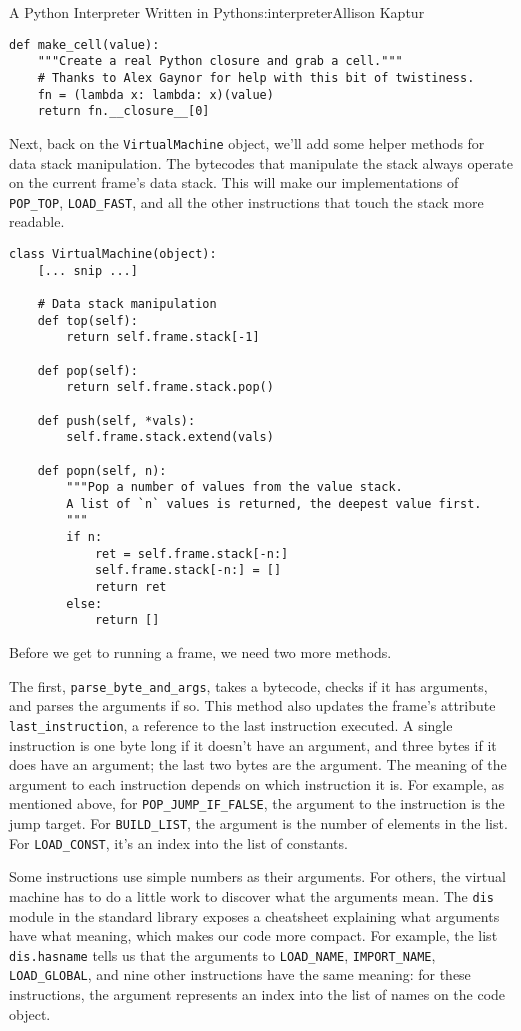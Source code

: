 \begin{aosachapter}{A Python Interpreter Written in Python}{s:interpreter}{Allison Kaptur}
\begin{verbatim}
def make_cell(value):
    """Create a real Python closure and grab a cell."""
    # Thanks to Alex Gaynor for help with this bit of twistiness.
    fn = (lambda x: lambda: x)(value)
    return fn.__closure__[0]
\end{verbatim}

Next, back on the \texttt{VirtualMachine} object, we'll add some helper
methods for data stack manipulation. The bytecodes that manipulate the
stack always operate on the current frame's data stack. This will make
our implementations of \texttt{POP\_TOP}, \texttt{LOAD\_FAST}, and all
the other instructions that touch the stack more readable.

\begin{verbatim}
class VirtualMachine(object):
    [... snip ...]

    # Data stack manipulation
    def top(self):
        return self.frame.stack[-1]

    def pop(self):
        return self.frame.stack.pop()

    def push(self, *vals):
        self.frame.stack.extend(vals)

    def popn(self, n):
        """Pop a number of values from the value stack.
        A list of `n` values is returned, the deepest value first.
        """
        if n:
            ret = self.frame.stack[-n:]
            self.frame.stack[-n:] = []
            return ret
        else:
            return []
\end{verbatim}

Before we get to running a frame, we need two more methods.

The first, \texttt{parse\_byte\_and\_args}, takes a bytecode, checks if
it has arguments, and parses the arguments if so. This method also
updates the frame's attribute \texttt{last\_instruction}, a reference to
the last instruction executed. A single instruction is one byte long if
it doesn't have an argument, and three bytes if it does have an
argument; the last two bytes are the argument. The meaning of the
argument to each instruction depends on which instruction it is. For
example, as mentioned above, for \texttt{POP\_JUMP\_IF\_FALSE}, the
argument to the instruction is the jump target. For
\texttt{BUILD\_LIST}, the argument is the number of elements in the
list. For \texttt{LOAD\_CONST}, it's an index into the list of
constants.

Some instructions use simple numbers as their arguments. For others, the
virtual machine has to do a little work to discover what the arguments
mean. The \texttt{dis} module in the standard library exposes a
cheatsheet explaining what arguments have what meaning, which makes our
code more compact. For example, the list \texttt{dis.hasname} tells us
that the arguments to \texttt{LOAD\_NAME}, \texttt{IMPORT\_NAME},
\texttt{LOAD\_GLOBAL}, and nine other instructions have the same
meaning: for these instructions, the argument represents an index into
the list of names on the code object.


\end{aosachapter}
